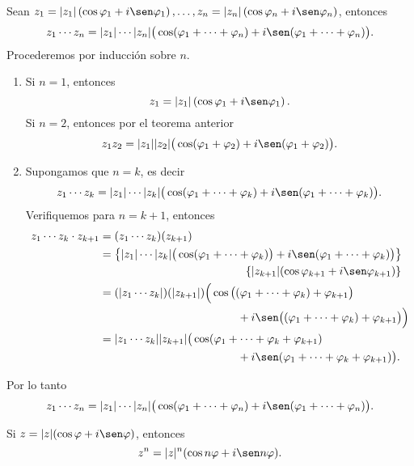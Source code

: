 \begin{proposition}
    Sean $z_1=|z_1| \left( \cos \varphi _1+i \sen \varphi _1 \right),  \dots,  z_n=|z_n| \left( \cos \varphi _n+i \sen \varphi _n \right)$, entonces
    $$z_1 \cdots z_n=|z_1|\cdots |z_n| \big( \cos (\varphi _1+\cdots +\varphi _n)+i \sen (\varphi _1+\cdots +\varphi _n) \big).$$
    \demostracion Procederemos por inducción sobre $n$.
    \begin{enumerate}[label=\roman*.]
        \item Si $n=1$, entonces $$z_1=|z_1| \left( \cos \varphi _1+ i \sen \varphi _1 \right).$$
        Si $n=2$, entonces por el teorema anterior
        $$z_1z_2=|z_1||z_2| \big( \cos (\varphi _1+\varphi _2) +i \sen (\varphi _1+\varphi _2) \big).$$
        \item Supongamos que $n=k$, es decir
        $$z_1 \cdots z_k=|z_1|\cdots |z_k| \big( \cos (\varphi _1+\cdots +\varphi _k)+i \sen (\varphi _1+\cdots +\varphi _k) \big).$$
        Verifiquemos para $n=k+1$, entonces
        \begin{align*}
            z_1 \cdots z_k \cdot z_{k+1} &=(z_1 \cdots z_k)(z_{k+1}) \\
            &=\left\lbrace |z_1|\cdots |z_k| \big( \cos (\varphi _1+\cdots +\varphi _k) \big) +i \sen (\varphi _1+\cdots +\varphi _k) \big) \right\rbrace \\
            & \hspace{4.5cm} \left\lbrace |z_{k+1}| (\cos \varphi _{k+1}+i \sen \varphi _{k+1}) \right\rbrace \\
            &=(|z_1 \cdots z_k|)(|z_{k+1}|) \Big( \cos \big( (\varphi _1+\cdots +\varphi _k)+\varphi _{k+1} \big) \\
            & \hspace{4.3cm} +i \sen \big( (\varphi _1+\cdots +\varphi _k)+\varphi _{k+1} \big) \Big) \\
            &=|z_1 \cdots z_k||z_{k+1}| \big( \cos (\varphi _1+\cdots +\varphi _k+\varphi _{k+1}) \\
            & \hspace{4.3cm} +i \sen (\varphi _1+\cdots +\varphi _k+\varphi _{k+1}) \big).
        \end{align*}
    \end{enumerate}
    Por lo tanto
    $$z_1 \cdots z_n=|z_1|\cdots |z_n| \big( \cos (\varphi _1+\cdots +\varphi _n)+i \sen (\varphi _1+\cdots +\varphi _n) \big).$$
\end{proposition}

\begin{corollary}
    Si $z=|z| (\cos \varphi +i \sen \varphi )$, entonces
    $$z^n=|z|^n (\cos n \varphi +i \sen n \varphi).$$
\end{corollary}

